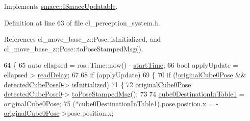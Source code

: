Implements \hyperlink{classsmacc_1_1ISmaccUpdatable_a84ee0520cbefdb1d412bed54650b028e}{smacc\+::\+I\+Smacc\+Updatable}.



Definition at line 63 of file cl\+\_\+perception\+\_\+system.\+h.



References cl\+\_\+move\+\_\+base\+\_\+z\+::\+Pose\+::is\+Initialized, and cl\+\_\+move\+\_\+base\+\_\+z\+::\+Pose\+::to\+Pose\+Stamped\+Msg().


\begin{DoxyCode}
64     \{
65         \textcolor{keyword}{auto} ellapsed = ros::Time::now() - \hyperlink{classsm__fetch__two__table__pick__n__place__1_1_1cl__perception__system_1_1ClPerceptionSystem_a3b88edd8d62e132052c3f0908839dbb1}{startTime};
66         \textcolor{keywordtype}{bool} applyUpdate = ellapsed > \hyperlink{classsm__fetch__two__table__pick__n__place__1_1_1cl__perception__system_1_1ClPerceptionSystem_aa10a1ed21636e7bdf001895860075383}{readDelay};
67 
68         \textcolor{keywordflow}{if} (applyUpdate)
69         \{
70             \textcolor{keywordflow}{if} (!\hyperlink{classsm__fetch__two__table__pick__n__place__1_1_1cl__perception__system_1_1ClPerceptionSystem_a9a81fba6b953fba9b27e0a2f222290d0}{originalCube0Pose} && \hyperlink{classsm__fetch__two__table__pick__n__place__1_1_1cl__perception__system_1_1ClPerceptionSystem_ab60765c4ba512b25c49c508464c49adb}{detectedCubePose0}->
      \hyperlink{classcl__move__base__z_1_1Pose_a49df3a978021edb71a48ef5e6d8e75a8}{isInitialized})
71             \{
72                 \hyperlink{classsm__fetch__two__table__pick__n__place__1_1_1cl__perception__system_1_1ClPerceptionSystem_a9a81fba6b953fba9b27e0a2f222290d0}{originalCube0Pose} = \hyperlink{classsm__fetch__two__table__pick__n__place__1_1_1cl__perception__system_1_1ClPerceptionSystem_ab60765c4ba512b25c49c508464c49adb}{detectedCubePose0}->
      \hyperlink{classcl__move__base__z_1_1Pose_a63887a88c1ac6e9a4a71b8d7d11aed6c}{toPoseStampedMsg}();
73 
74                 \hyperlink{classsm__fetch__two__table__pick__n__place__1_1_1cl__perception__system_1_1ClPerceptionSystem_a4badbcb867d3baa93ddc40e73efe8d3f}{cube0DestinationInTable1} = 
      \hyperlink{classsm__fetch__two__table__pick__n__place__1_1_1cl__perception__system_1_1ClPerceptionSystem_a9a81fba6b953fba9b27e0a2f222290d0}{originalCube0Pose};
75                 (*cube0DestinationInTable1).pose.position.x = - 
      \hyperlink{classsm__fetch__two__table__pick__n__place__1_1_1cl__perception__system_1_1ClPerceptionSystem_a9a81fba6b953fba9b27e0a2f222290d0}{originalCube0Pose}->pose.position.x;

\end{DoxyCode}
